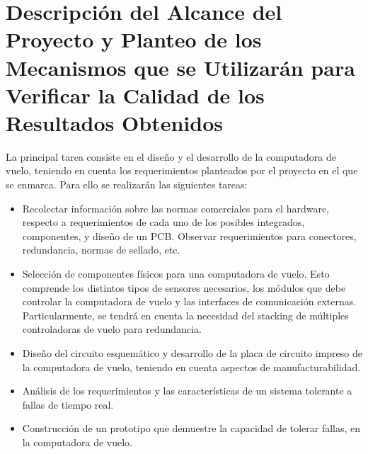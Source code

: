 \section{Descripción del Alcance del Proyecto y Planteo de los Mecanismos que se Utilizarán para Verificar la Calidad de los Resultados Obtenidos}

La principal tarea consiste en el diseño y el desarrollo de la computadora de vuelo, teniendo en cuenta los requerimientos planteados por el proyecto en el que se enmarca. Para ello se realizarán las siguientes tareas:

\begin{itemize}
    \item Recolectar información sobre las normas comerciales para el hardware, respecto a requerimientos de cada uno de los posibles integrados, componentes, y diseño de un PCB. Observar requerimientos para conectores, redundancia, normas de sellado, etc.
    \item Selección de componentes físicos para una computadora de vuelo. Esto comprende los distintos tipos de sensores necesarios, los módulos que debe controlar la computadora de vuelo y las interfaces de comunicación externas. Particularmente, se tendrá en cuenta la necesidad del stacking de múltiples controladoras de vuelo para redundancia.
    \item Diseño del circuito esquemático y desarrollo de la placa de circuito impreso de la computadora de vuelo, teniendo en cuenta aspectos de manufacturabilidad.
    \item Análisis de los requerimientos y las características de un sistema tolerante a fallas de tiempo real.
    \item Construcción de un prototipo que demuestre la capacidad de tolerar fallas, en la computadora de vuelo. 
\end{itemize}